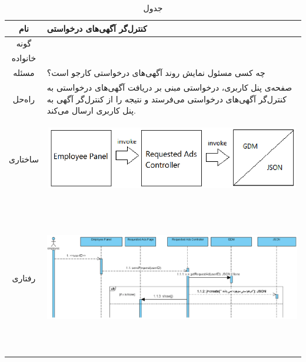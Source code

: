 \begin{table}[H]
	\begin{adjustbox}{width=\textwidth}
		\begin{tabular}{|c|p{\textwidth}|}
			\hline
			نام &
			کنترل‌گر آگهی‌های درخواستی \\ 
			\hline
			گونه & 
			\grasp \\
			\hline
			خانواده &
			\controller \\
			\hline
			مسئله & 
			چه کسی مسئول نمایش روند آگهی‌های درخواستی کارجو است؟\\
			\hline
			راه‌حل& 
			صفحه‌ی پنل ‌کاربری، درخواستی مبنی بر دریافت آگهی‌های درخواستی به کنترل‌گر آگهی‌های درخواستی می‌فرستد و نتیجه را از کنترل‌گر آگهی به پنل کاربری ارسال می‌کند. \\
			\hline
			ساختاری & 
			\begin{minipage}{\textwidth}
				\begin{flushleft}
					\begin{minipage}{\textwidth}
						\includegraphics[width=13cm, height=2.7cm]{./images/7-5-1}
					\end{minipage}
				\end{flushleft}
			\end{minipage}
			
			\\
			\hline
			رفتاری & 
			\begin{minipage}{\textwidth}
				\begin{flushleft}
					\begin{minipage}{\textwidth}
						\includegraphics[width=13.5cm, height=6cm]{./images/7-5-2}
					\end{minipage}
				\end{flushleft}
			\end{minipage}
			\\
			\hline
		\end{tabular}
	\end{adjustbox}
	\caption{جدول }
	\label{table-with-pic:5}
\end{table}

